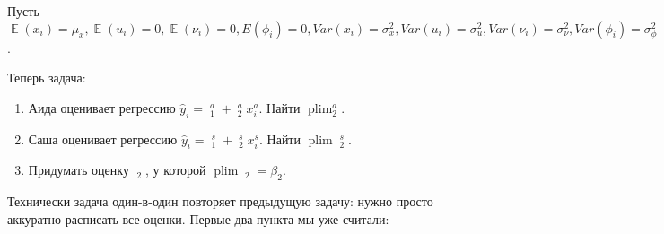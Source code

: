 \documentclass[10pt, a4paper]{extarticle}
\DeclareMathOperator{\E}{\mathbb{E}}
\DeclareMathOperator{\plim}{plim}
\DeclareMathOperator{\hb}{\hat{\beta}}
\begin{document}
Пусть $\E(x_i) = \mu_x, \E(u_i) = 0, \E(\nu_i) = 0, E(\phi_i) = 0, Var(x_i) = \sigma_x^2, Var(u_i) = \sigma_u^2, Var(\nu_i) = \sigma_\nu^2, Var(\phi_i) = \sigma_\phi^2$.

Теперь задача:
\begin{enumerate}
	\item Аида оценивает регрессию $\hat{y}_i = \hb_1^a + \hb_2^ax_i^a$. Найти $\text{plim} \hb_2^a$.
	
	\item Саша оценивает регрессию $\hat{y}_i = \hb_1^s + \hb_2^sx_i^s$. Найти $\plim \hb_2^s$.
	
	\item Придумать оценку $\hb_2$, у которой $\plim \hb_2 = \beta_2$.
	
\end{enumerate}

Технически задача один-в-один повторяет предыдущую задачу: нужно просто аккуратно расписать все оценки. Первые два пункта мы уже считали:
\end{document}

